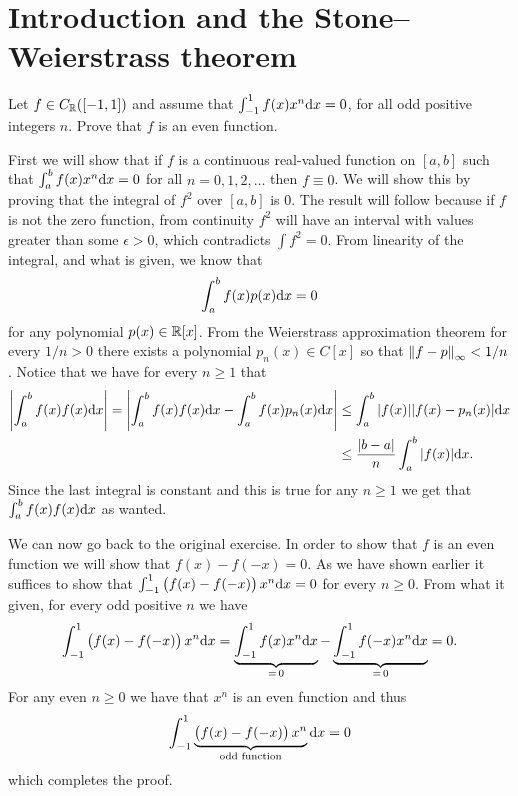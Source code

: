 \documentclass[11pt,a4paper]{article}
\begin{document}
\maketitle

\newpage
\tableofcontents
\newpage

\section{Introduction and the Stone--Weierstrass theorem}

\begin{exercise}
  Let $f \in C_{\mathbb{R}}([-1,1])$ and assume that $\int_{-1}^{1} f(x) x^n \dx = 0$,
  for all odd positive integers $n$.
  Prove that $f$ is an even function.
\end{exercise}
\begin{solution}
  First we will show that if $f$ is a continuous real-valued function on $[a,b]$
  such that $\int_{a}^{b} f(x) x^n \dx = 0$ for all $n = 0,1,2,\dots$
  then $f \equiv 0$.
  We will show this by proving that the integral of $f^2$ over $[a,b]$
  is $0$.
  The result will follow because if $f$ is not the zero function,
  from continuity $f^2$ will have an interval with values greater than
  some $\epsilon > 0$, which contradicts $\int f^2 = 0$.
  From linearity of the integral, and what is given, we know that
  \[
    \int_{a}^{b} f(x) p(x) \dx = 0
  \]
  for any polynomial $p(x) \in \mathbb{R}[x]$.
  From the Weierstrass approximation theorem for every $1/n > 0$
  there exists a polynomial $p_n(x) \in C[x]$ so that
  $\left\lVert f - p\right\rVert_{\infty} < 1 / n$.
  Notice that we have for every $n \geq 1$ that
  \begin{align*}
    \abs{\int_{a}^{b} f(x)f(x) \dx} =
    \abs{\int_{a}^{b} f(x)f(x) \dx - \int_{a}^{b} f(x)p_n(x) \dx} &\le
    \int_{a}^{b} |f(x)| |f(x) - p_n(x)| \dx \\ &\le
    \frac{\abs{b-a}}{n} \int_{a}^{b} |f(x)| \dx.
  \end{align*}
  Since the last integral is constant and this is true for any $n \geq 1$
  we get that $\int_{a}^{b} f(x)f(x) \dx$ as wanted.

  We can now go back to the original exercise.
  In order to show that $f$ is an even function we will
  show that $f(x) - f(-x) = 0$.
  As we have shown earlier it suffices to show that
  $\int_{-1}^{1} \del{f(x) - f(-x)} x^n \dx = 0$ for every $n \geq 0$.
  From what it given, for every odd positive $n$ we have
  \[
    \int_{-1}^{1} \del{f(x) - f(-x)} x^n \dx =
    \underbrace{\int_{-1}^{1} f(x)  x^n \dx}_{=\,0} -
    \underbrace{\int_{-1}^{1} f(-x) x^n \dx}_{=\,0} = 0.
  \]
  For any even $n \geq 0$ we have that $x^n$ is an even function and thus
  \[
    \int_{-1}^{1}
    \underbrace{\del{f(x) - f(-x)} x^n}_{\text{odd function}} \dx = 0
  \]
  which completes the proof.
\end{solution}
\end{document}
